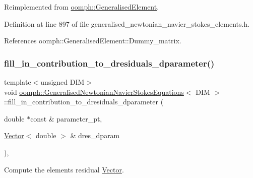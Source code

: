 Reimplemented from \hyperlink{classoomph_1_1GeneralisedElement_a90ee6ee39dd3950f625148d960f1ba67}{oomph\+::\+Generalised\+Element}.



Definition at line 897 of file generalised\+\_\+newtonian\+\_\+navier\+\_\+stokes\+\_\+elements.\+h.



References oomph\+::\+Generalised\+Element\+::\+Dummy\+\_\+matrix.

\mbox{\label{classoomph_1_1GeneralisedNewtonianNavierStokesEquations_a315b6dd9916836000c858a434d198851}} 
\subsubsection{\texorpdfstring{fill\+\_\+in\+\_\+contribution\+\_\+to\+\_\+dresiduals\+\_\+dparameter()}{fill\_in\_contribution\_to\_dresiduals\_dparameter()}}
{\footnotesize\ttfamily template$<$unsigned D\+IM$>$ \\
void \hyperlink{classoomph_1_1GeneralisedNewtonianNavierStokesEquations}{oomph\+::\+Generalised\+Newtonian\+Navier\+Stokes\+Equations}$<$ D\+IM $>$\+::fill\+\_\+in\+\_\+contribution\+\_\+to\+\_\+dresiduals\+\_\+dparameter (\begin{DoxyParamCaption}\item[{double $\ast$const \&}]{parameter\+\_\+pt,  }\item[{\hyperlink{classoomph_1_1Vector}{Vector}$<$ double $>$ \&}]{dres\+\_\+dparam }\end{DoxyParamCaption})\hspace{0.3cm}{\ttfamily [inline]}, {\ttfamily [virtual]}}



Compute the element\textquotesingle{}s residual \hyperlink{classoomph_1_1Vector}{Vector}. 



